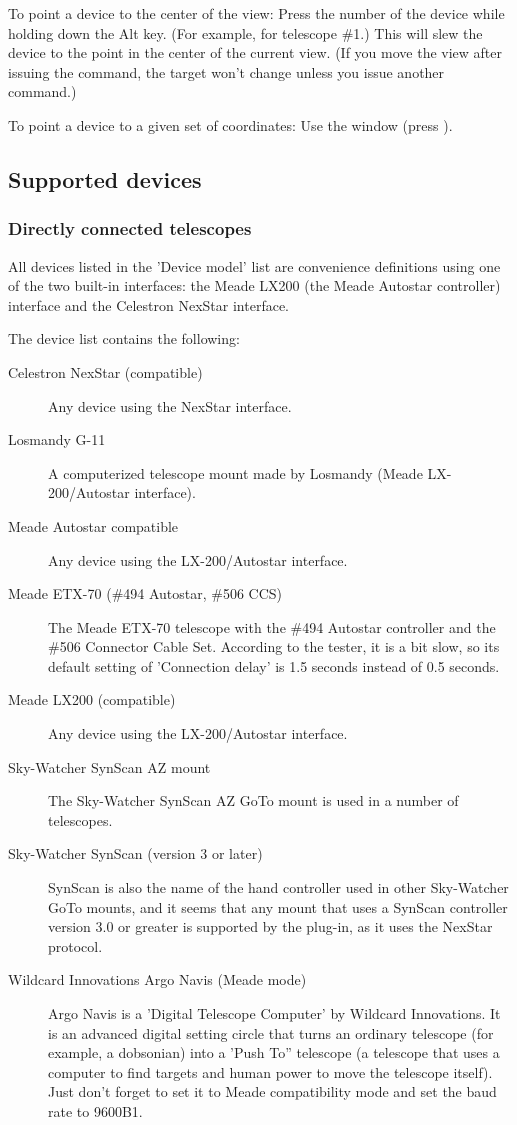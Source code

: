 To point a device to the center of the view: Press the number of the
device while holding down the Alt key. (For example,  for
telescope \#1.) This will slew the device to the point in the center of
the current view. (If you move the view after issuing the command, the
target won't change unless you issue another command.)

To point a device to a given set of coordinates: Use the  window (press ).

\subsection{Supported devices}
\label{sec:plugins:TelescopeControl:supported}

\subsubsection{Directly connected telescopes}
All devices listed in the 'Device model' list are convenience
definitions using one of the two built-in interfaces: the Meade LX200
(the Meade Autostar controller) interface and the Celestron NexStar
interface.

The device list contains the following:
\begin{description}
\item[Celestron NexStar (compatible)] Any device using the NexStar
  interface.
\item[Losmandy G-11] A computerized telescope mount made by Losmandy
  (Meade LX-200/Autostar interface).
\item[Meade Autostar compatible] Any device using the LX-200/Autostar
  interface.
\item[Meade ETX-70 (\#494 Autostar, \#506 CCS)] The Meade ETX-70
  telescope with the \#494 Autostar controller and the \#506 Connector
  Cable Set. According to the tester, it is a bit slow, so its default
  setting of 'Connection delay' is 1.5 seconds instead of 0.5 seconds.
\item[Meade LX200 (compatible)] Any device using the LX-200/Autostar
  interface.
\item[Sky-Watcher SynScan AZ mount] The Sky-Watcher SynScan AZ GoTo
  mount is used in a number of telescopes.
\item[Sky-Watcher SynScan (version 3 or later)] SynScan is also the
  name of the hand controller used in other Sky-Watcher GoTo mounts,
  and it seems that any mount that uses a SynScan controller version
  3.0 or greater is supported by the plug-in, as it uses the NexStar
  protocol.
\item[Wildcard Innovations Argo Navis (Meade mode)] Argo Navis is a
  'Digital Telescope Computer' by Wildcard Innovations. It is an
  advanced digital setting circle that turns an ordinary telescope
  (for example, a dobsonian) into a 'Push To'' telescope (a telescope
  that uses a computer to find targets and human power to move the
  telescope itself). Just don't forget to set it to Meade
  compatibility mode and set the baud rate to 9600B1.
\end{description}

